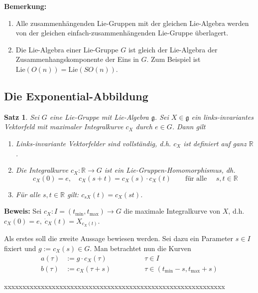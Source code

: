 \documentclass[12pt,a4paper]{article}
\def\R{\mathbb{R}}
\def\Lie{\mathrm{Lie}}
\def\g{\mathfrak{g}}
\newtheorem{Satz}[Lemma]{Satz}
\def\proof{\noindent\textbf{Beweis:}\quad}
\begin{document}
\bigskip

{\bf Bemerkung:}
\begin{enumerate}
\item
Alle zusammenh\"angenden Lie-Gruppen mit der gleichen Lie-Algebra werden von der gleichen
einfach-zusammenh\"angenden Lie-Gruppe \"uberlagert.
\item
Die Lie-Algebra einer Lie-Gruppe $G$ ist gleich der Lie-Algebra der Zusammenhangskomponente
der Eins in $G$. Zum Beispiel ist $\Lie(O(n)) = \Lie(SO(n))$.
\end{enumerate}


\bigskip

\subsection{Die Exponential-Abbildung}

\bigskip

\begin{Satz}\label{satz1}
Sei $G$ eine Lie-Gruppe mit Lie-Algebra $\g$. Sei $X\in \g$ ein links-invariantes Vektorfeld mit
maximaler Integralkurve $c_X$ durch $e\in G$. Dann gilt
\begin{enumerate}
\item
Links-invariante Vektorfelder sind vollst\"andig, d.h. $c_X$ ist definiert auf ganz $\R$.
\item
Die Integralkurve $c_X : \R \rightarrow G$ ist ein Lie-Gruppen-Homomorphismus, dh.
$$
c_X(0) = e, \quad c_X(s+t) = c_X(s) \cdot c_X(t) \qquad \mbox{f\"ur alle }\quad s, t \in \R
$$
\item
F\"ur alle $s, t \in \R$ gilt: $c_{sX}(t) = c_X(s t)$.
\end{enumerate}
\end{Satz}
\proof
Sei $c_X : I = (t_{\min}, t_{\max})\rightarrow G$ die maximale Integralkurve von $X$, d.h.
$c_X(0)=e, \; \dot c_X(t)= X_{c_X(t)}$.

\medskip

Als erstes soll die zweite Aussage bewiesen werden. Sei dazu ein Parameter $s\in I$ fixiert  und $g:=c_X(s)\in G$.
Man betrachtet nun die Kurven
$$
\begin{array}{rll}
a(\tau) &:= g \cdot c_X(\tau ) &\qquad \qquad  \tau \in I \\[1.5ex]
b(\tau) &:= c_X(\tau + s)      &\qquad \qquad\tau \in (t_{\min}-s, t_{\max}+s)
\end{array}
$$


xxxxxxxxxxxxxxxxxxxxxxxxxxxxxxxxxxxxxxxxxxxxxxxxxxxxxxxxxxxx
\end{document}
